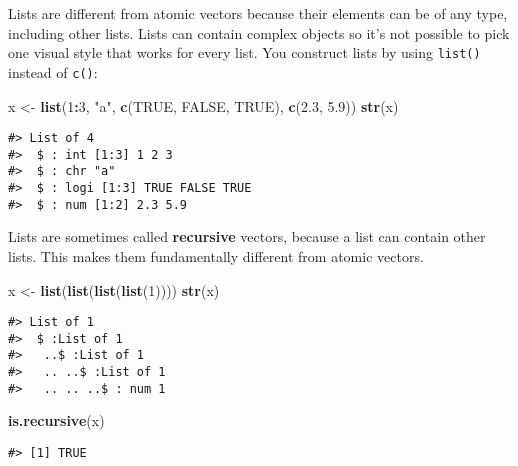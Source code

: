 \documentclass[]{book}
\newenvironment{Shaded}{\begin{snugshade}}{\end{snugshade}}
\newcommand{\KeywordTok}[1]{\textcolor[rgb]{0.13,0.29,0.53}{\textbf{#1}}}
\newcommand{\DecValTok}[1]{\textcolor[rgb]{0.00,0.00,0.81}{#1}}
\newcommand{\FloatTok}[1]{\textcolor[rgb]{0.00,0.00,0.81}{#1}}
\newcommand{\StringTok}[1]{\textcolor[rgb]{0.31,0.60,0.02}{#1}}
\newcommand{\OtherTok}[1]{\textcolor[rgb]{0.56,0.35,0.01}{#1}}
\newcommand{\OperatorTok}[1]{\textcolor[rgb]{0.81,0.36,0.00}{\textbf{#1}}}
\newcommand{\NormalTok}[1]{#1}
\theoremstyle{definition}
\theoremstyle{definition}
\theoremstyle{definition}
\theoremstyle{remark}
\begin{document}
Lists are different from atomic vectors because their elements can be of
any type, including other lists. Lists can contain complex objects so
it's not possible to pick one visual style that works for every list.
You construct lists by using \texttt{list()} instead of \texttt{c()}:

\begin{Shaded}
\begin{Highlighting}[]
\NormalTok{x <-}\StringTok{ }\KeywordTok{list}\NormalTok{(}\DecValTok{1}\OperatorTok{:}\DecValTok{3}\NormalTok{, }\StringTok{"a"}\NormalTok{, }\KeywordTok{c}\NormalTok{(}\OtherTok{TRUE}\NormalTok{, }\OtherTok{FALSE}\NormalTok{, }\OtherTok{TRUE}\NormalTok{), }\KeywordTok{c}\NormalTok{(}\FloatTok{2.3}\NormalTok{, }\FloatTok{5.9}\NormalTok{))}
\KeywordTok{str}\NormalTok{(x)}
\end{Highlighting}
\end{Shaded}

\begin{verbatim}
#> List of 4
#>  $ : int [1:3] 1 2 3
#>  $ : chr "a"
#>  $ : logi [1:3] TRUE FALSE TRUE
#>  $ : num [1:2] 2.3 5.9
\end{verbatim}

Lists are sometimes called \textbf{recursive} vectors, because a list
can contain other lists. This makes them fundamentally different from
atomic vectors.

\begin{Shaded}
\begin{Highlighting}[]
\NormalTok{x <-}\StringTok{ }\KeywordTok{list}\NormalTok{(}\KeywordTok{list}\NormalTok{(}\KeywordTok{list}\NormalTok{(}\KeywordTok{list}\NormalTok{(}\DecValTok{1}\NormalTok{))))}
\KeywordTok{str}\NormalTok{(x)}
\end{Highlighting}
\end{Shaded}

\begin{verbatim}
#> List of 1
#>  $ :List of 1
#>   ..$ :List of 1
#>   .. ..$ :List of 1
#>   .. .. ..$ : num 1
\end{verbatim}

\begin{Shaded}
\begin{Highlighting}[]
\KeywordTok{is.recursive}\NormalTok{(x)}
\end{Highlighting}
\end{Shaded}

\begin{verbatim}
#> [1] TRUE
\end{verbatim}
\end{document}

